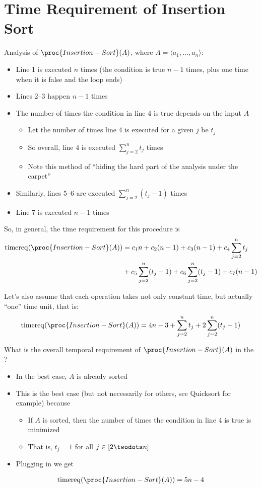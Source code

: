 \documentclass[a4paper]{report}
\newcommand{\bookref}[3]{\marginpar{\faBook{}~#1\\Chapter #2\\Section #3}}
\theoremstyle{definition}
\DeclareMathOperator*{\treq}{timereq}
\begin{document}
\section{Time Requirement of Insertion Sort}
\bookref{CLRS}{2}{2.2}
Analysis of $\proc{Insertion-Sort}(A)$, where $A = \langle a_1,\dots{}, a_n\rangle$:

\begin{itemize}
\item Line 1 is executed $n$ times (the condition is true $n-1$ times, plus one time when it is false and the loop ends)
\item Lines 2--3 happen $n-1$ times
\item The number of times the condition in line 4 is true depends on the input $A$
\begin{itemize} 
\item Let the number of times line 4 is executed for a given $j$ be $t_j$
\item So overall, line 4 is executed $\sum_{j = 2}^n t_j$ times
\item Note this method of ``hiding the hard part of the analysis under the carpet''
\end{itemize}
\item Similarly, lines 5--6 are executed $\sum_{j = 2}^n (t_j-1)$ times
\item Line 7 is executed $n-1$ times
\end{itemize}

So, in general, the time requirement for this procedure is
\begin{align*}
\treq(\proc{Insertion-Sort}(A)) & = c_1n+c_2(n-1)+c_3(n-1)+c_4\sum_{j=2}^{n}t_j\\& + c_5\sum_{j=2}^{n}(t_j-1)+c_6\sum_{j=2}^{n}(t_j-1)+c_7(n-1)
\end{align*}

Let's also assume that each operation takes not only constant time, but actually ``one'' time unit, that is:
\begin{align*}
\treq(\proc{Insertion-Sort}(A)) = 4n-3+\sum_{j=2}^{n}t_j+2\sum_{j=2}^{n}(t_j-1)
\end{align*}


What is the overall temporal requirement of $\proc{Insertion-Sort}(A)$ in the ?
\begin{itemize}
\item In the best case, $A$ is already sorted
\item This is the best case  (but not necessarily for others, see Quicksort for example) because
\begin{itemize}
\item If $A$ is sorted, then the number of times the condition in line 4 is true is minimized
\item That is, $t_j = 1$ for all $j \in [2 \twodots n]$
\end{itemize}
\item Plugging in we get
\end{itemize}
\begin{align*}
\treq(\proc{Insertion-Sort}(A)) = 5n-4
\end{align*}
\end{document}

